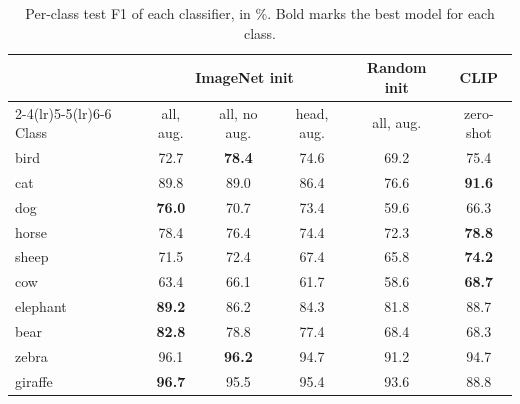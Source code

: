 \begin{table}[H]
\centering
\caption{Per-class test F1 of each classifier, in \%. Bold marks the best model for each class.}
\label{tab:perclass_f1}
\begin{threeparttable}
\begin{tabular}{lccccc}
\toprule
 & \multicolumn{3}{c}{ImageNet init} & Random init & CLIP \\
\cmidrule(lr){2-4}\cmidrule(lr){5-5}\cmidrule(lr){6-6}
Class & all, aug. & all, no aug. & head, aug. & all, aug. & zero-shot \\
\midrule
bird & 72.7 & \textbf{78.4} & 74.6 & 69.2 & 75.4 \\
cat & 89.8 & 89.0 & 86.4 & 76.6 & \textbf{91.6} \\
dog & \textbf{76.0} & 70.7 & 73.4 & 59.6 & 66.3 \\
horse & 78.4 & 76.4 & 74.4 & 72.3 & \textbf{78.8} \\
sheep & 71.5 & 72.4 & 67.4 & 65.8 & \textbf{74.2} \\
cow & 63.4 & 66.1 & 61.7 & 58.6 & \textbf{68.7} \\
elephant & \textbf{89.2} & 86.2 & 84.3 & 81.8 & 88.7 \\
bear & \textbf{82.8} & 78.8 & 77.4 & 68.4 & 68.3 \\
zebra & 96.1 & \textbf{96.2} & 94.7 & 91.2 & 94.7 \\
giraffe & \textbf{96.7} & 95.5 & 95.4 & 93.6 & 88.8 \\
\bottomrule
\end{tabular}
\end{threeparttable}
\end{table}
